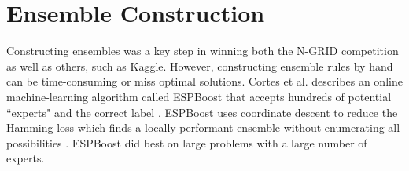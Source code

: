 \section{Ensemble Construction} Constructing ensembles was a key step in winning both the N-GRID competition as well as others, such as Kaggle. However, constructing ensemble rules by hand can be time-consuming or miss optimal solutions. Cortes et al. describes an online machine-learning algorithm called \textsf{ESPBoost} that accepts hundreds of potential ``experts" and the correct label \cite{espboost}. \textsf{ESPBoost} uses coordinate descent to reduce the Hamming loss which finds a locally performant ensemble without enumerating all possibilities \cite{coordinate-descent,hamming-loss}. \textsf{ESPBoost} did best on large problems with a large number of experts.
 